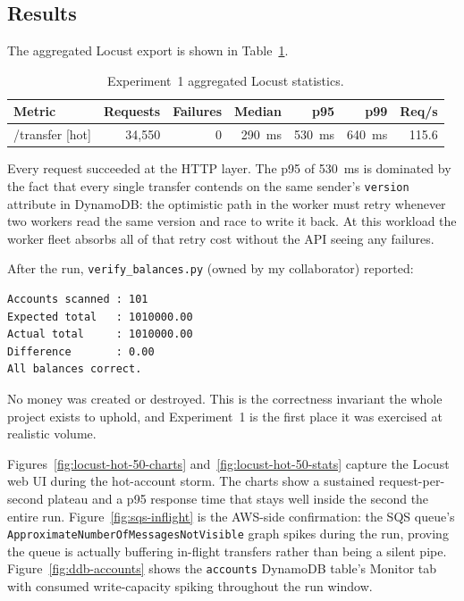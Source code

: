 \documentclass[11pt,a4paper]{article}
\begin{document}
\subsection{Results}

The aggregated Locust export is shown in Table~\ref{tab:exp1}.

\begin{table}[H]
\centering
\caption{Experiment~1 aggregated Locust statistics.}
\label{tab:exp1}
\begin{tabular}{lrrrrrr}
\toprule
Metric & Requests & Failures & Median & p95 & p99 & Req/s \\
\midrule
/transfer [hot] & 34{,}550 & 0 & 290~ms & 530~ms & 640~ms & 115.6 \\
\bottomrule
\end{tabular}
\end{table}

Every request succeeded at the HTTP layer. The p95 of 530~ms is dominated by the fact that every single transfer contends on the same sender's \texttt{version} attribute in DynamoDB: the optimistic path in the worker must retry whenever two workers read the same version and race to write it back. At this workload the worker fleet absorbs all of that retry cost without the API seeing any failures.

After the run, \texttt{verify\_balances.py} (owned by my collaborator) reported:

\begin{lstlisting}
Accounts scanned : 101
Expected total   : 1010000.00
Actual total     : 1010000.00
Difference       : 0.00
All balances correct.
\end{lstlisting}

No money was created or destroyed. This is the correctness invariant the whole project exists to uphold, and Experiment~1 is the first place it was exercised at realistic volume.

Figures~\ref{fig:locust-hot-50-charts} and~\ref{fig:locust-hot-50-stats} capture the Locust web UI during the hot-account storm. The charts show a sustained request-per-second plateau and a p95 response time that stays well inside the second the entire run. Figure~\ref{fig:sqs-inflight} is the AWS-side confirmation: the SQS queue's \texttt{ApproximateNumberOfMessagesNotVisible} graph spikes during the run, proving the queue is actually buffering in-flight transfers rather than being a silent pipe. Figure~\ref{fig:ddb-accounts} shows the \texttt{accounts} DynamoDB table's Monitor tab with consumed write-capacity spiking throughout the run window.
\end{document}
